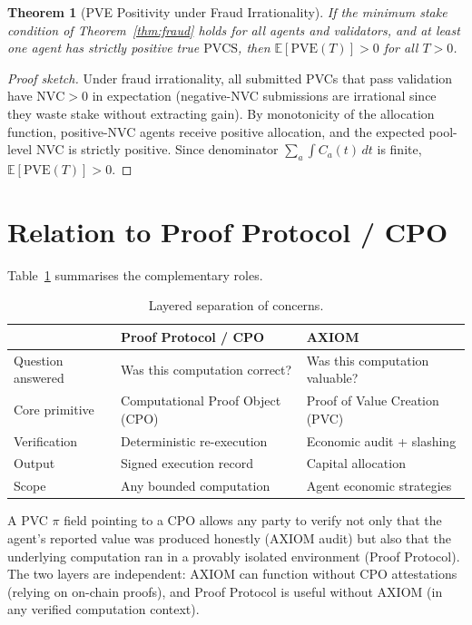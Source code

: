 \documentclass[11pt,a4paper]{article}
\theoremstyle{plain}
\newtheorem{theorem}{Theorem}[section]
\theoremstyle{definition}
\theoremstyle{remark}
\newcommand{\PVCS}{\mathrm{PVCS}}
\newcommand{\NVC}{\mathrm{NVC}}
\newcommand{\PVE}{\mathrm{PVE}}
\newcommand{\E}{\mathbb{E}}
\begin{document}
\begin{theorem}[PVE Positivity under Fraud Irrationality]
\label{thm:pve}
If the minimum stake condition of Theorem~\ref{thm:fraud} holds for all agents
and validators, and at least one agent has strictly positive true $\PVCS$,
then $\E[\PVE(T)] > 0$ for all $T > 0$.
\end{theorem}

\begin{proof}[Proof sketch]
Under fraud irrationality, all submitted PVCs that pass validation have
$\NVC > 0$ in expectation (negative-NVC submissions are irrational since
they waste stake without extracting gain). By monotonicity of the allocation
function, positive-NVC agents receive positive allocation, and the expected
pool-level NVC is strictly positive. Since denominator $\sum_a \int C_a(t)\,dt$
is finite, $\E[\PVE(T)] > 0$.
\end{proof}

\section{Relation to Proof Protocol / CPO}

Table~\ref{tab:comparison} summarises the complementary roles.

\begin{table}[h]
\centering
\begin{tabular}{lll}
\toprule
& \textbf{Proof Protocol / CPO} & \textbf{AXIOM} \\
\midrule
Question answered & Was this computation correct? & Was this computation valuable? \\
Core primitive    & Computational Proof Object (CPO) & Proof of Value Creation (PVC) \\
Verification      & Deterministic re-execution & Economic audit + slashing \\
Output            & Signed execution record & Capital allocation \\
Scope             & Any bounded computation & Agent economic strategies \\
\bottomrule
\end{tabular}
\caption{Layered separation of concerns.}
\label{tab:comparison}
\end{table}

A PVC $\pi$ field pointing to a CPO allows any party to verify not only
that the agent's reported value was produced honestly (AXIOM audit) but also
that the underlying computation ran in a provably isolated environment
(Proof Protocol). The two layers are independent: AXIOM can function without
CPO attestations (relying on on-chain proofs), and Proof Protocol is useful
without AXIOM (in any verified computation context).
\end{document}
